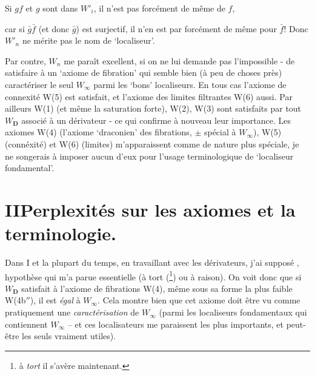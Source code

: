 \hspace*{3em}Si $gf$ et $g$ sont dans $W'_i$, il n'est pas forcément de même de $f$,

car si $\bar{g}\bar{f}$ (et donc $\bar{g}$) est surjectif, il n'en est par forcément de même pour $\bar{f}$! Donc $W'_n$ ne mérite pas le nom de `localiseur'. %

Par contre, $W_n$ me paraît excellent, si on ne lui demande pas l'impossible - de satisfaire à un `axiome de fibration' qui semble bien (à peu de choses près) caractériser le seul $W_\infty$ parmi les `bons' localiseurs. En tous cas l'axiome de connexité W(5) est satisfait, et l'axiome des limites filtrantes W(6) aussi. Par ailleurs W(1) (et même la saturation forte), W(2), W(3) sont satisfaits par tout $W_{\mathbf{D}}$ associé à un dérivateur - ce qui confirme à nouveau leur importance. Les axiomes W(4) (l'axiome `draconien' des fibrations, $\pm$ spécial à $W_\infty$), W(5) (connéxité) et %
W(6) (limites) m'apparaissent comme de nature plus spéciale, je ne songerais à imposer aucun d'eux pour l'usage terminologique de `localiseur fondamental'.

\newpage
{}
\section*{II\quad Perplexités sur les axiomes et la terminologie.}

Dans I et la plupart du temps, en travaillant avec les dérivateurs, j'ai supposé , hypothèse qui m'a parue essentielle (à tort (\footnote[38]{à \textit{tort} il s'avère maintenant.}) ou à raison). On voit donc que si $W_{\mathbf{D}}$ satisfait à l'axiome de fibrations W(4), même sous sa forme la plus faible W(4b$''$), il est \textit{égal} à $W_\infty$. Cela montre bien que cet axiome doit être vu comme pratiquement une \textit{caractérisation} de $W_\infty$ (parmi les localiseurs fondamentaux qui contiennent $W_\infty$ -- et ces localisateurs me paraissent les plus importants, et peut-être les seuls vraiment utiles).

